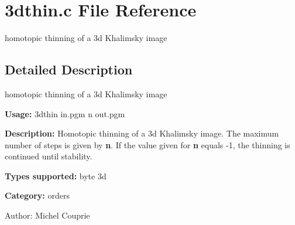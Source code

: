 \section{3dthin.c File Reference}
\label{3dthin_8c}
homotopic thinning of a 3d Khalimsky image  




\label{_details}
\subsection{Detailed Description}
homotopic thinning of a 3d Khalimsky image 

{\bf Usage:} 3dthin in.pgm n out.pgm

{\bf Description:} Homotopic thinning of a 3d Khalimsky image. The maximum number of steps is given by {\bf n}. If the value given for {\bf n} equals -1, the thinning is continued until stability.

{\bf Types supported:} byte 3d

{\bf Category:} orders

\begin{Desc}
\item[Author:]Michel Couprie \end{Desc}
